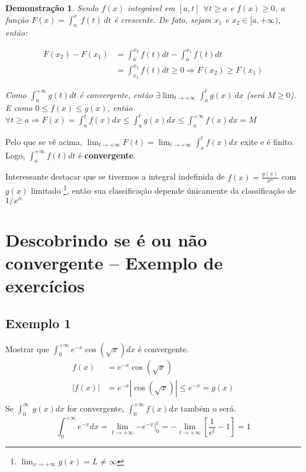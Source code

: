 \documentclass[12pt,openany]{book}
\newtheorem{demonstration}{Demonstração}
\begin{document}
\begin{demonstration}
Sendo $f(x)$ integrável em $[a,t] \ \ \forall t \geq a$ e $f(x) \geq 0$, a função $\displaystyle{F(x) = \int_a^x\ f(t)\ dt}$ é crescente. De fato, sejam $x_1$ e $x_2 \in [a,+\infty)$, então:

\begin{align*}
F(x_2)-F(x_1) &= \int_a^{x_2} f(t)dt - \int_a^{x_1} f(t)dt \\
&= \int_{x_1}^{x_2} f(t)dt \geq 0 \Rightarrow F(x_2) \geq F(x_1)
\end{align*}

Como $\displaystyle{\int_a^{+\infty} g(t)dt}$ é convergente, então $\displaystyle{\exists \lim_{t \rightarrow +\infty} \int_a^t g(x)\ dx} $ (será $M \geq 0$). E como $0 \leq f(x) \leq g(x)$, então $\forall t \geq a \Rightarrow F(x) = \int_a^t f(x)dx \leq \int_a^t g(x)dx \leq \int_a^{+\infty} f(x)dx = M$
\end{demonstration}
\vspace{10pt}

Pelo que se vê acima, $\displaystyle{\lim_{t\rightarrow+\infty} F(t) = \lim_{t\rightarrow+\infty} \int_a^t f(x)dx}$ exite e é finito. Logo, $\displaystyle{\int_a^{+\infty} f(t)dt}$ é \textbf{convergente}.

Interessante destacar que se tivermos a integral indefinida de $\displaystyle{f(x) =  \frac{g(x)}{x^{\alpha}}}$ com $g(x)$ limitado \footnote{$\displaystyle{\lim_{x \rightarrow +\infty} g(x)} = L \neq \infty $}, então sua classificação depende únicamente da classificação de $1 /x^\alpha$ 

\section{Descobrindo se é ou não convergente -- Exemplo de exercícios}
\label{sec:s14}

\subsection*{Exemplo 1}
\label{sub:ex141}

Mostrar que $\displaystyle{\int_0^{+\infty} e^{-x} \cos(\sqrt x) dx} $ é  convergente.
\begin{align*}
f(x) &= e^{-x} \cos(\sqrt x) \\
|f(x)| &= e^{-x}  |\cos(\sqrt x)| \leq e^{-x} = g(x) \\
\end{align*}
Se $\displaystyle{\int_0^\infty \ g(x)dx}$ for convergente, $\displaystyle{\int_0^{+\infty}f(x)dx }$ também o será.
$$ \int_0^{+\infty}e^{-x}dx = \lim_{t \rightarrow +\infty} \left.-e^{-x} \right|_0^t = - \lim_{t \rightarrow +\infty} \left[\frac{1}{e^t}-1 \right] = 1$$
\end{document}
